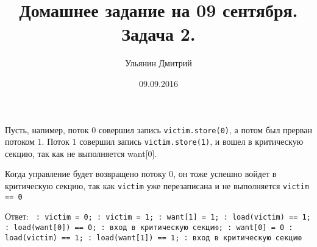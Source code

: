 \documentclass[]{article}
\title{Домашнее задание на 09 сентября. Задача 2.}
\author{Ульянин Дмитрий}
\date{09.09.2016}
\begin{document}
\maketitle

Пусть, напимер, поток $0$ совершил запись \texttt{victim.store(0)}, а потом был прерван потоком $1$. Поток $1$ совершил запись \texttt{victim.store(1)}, и вошел в критическую секцию, так как не выполняется want[0].

Когда управление будет возвращено потоку $0$, он тоже успешно войдет в критическую секцию, так как \texttt{victim} уже перезаписана и не выполняется \texttt{victim == 0}

Ответ: \texttt{
	: victim = 0;
	: victim = 1;
	: want[1] = 1;
	: load(victim) == 1;
	: load(want[0]) == 0;
	: вход в критическую секцию;
	: want[0] = 0
	: load(victim) == 1;
	: load(want[1]) == 1;
	: вход в критическую секцию}
\end{document}
